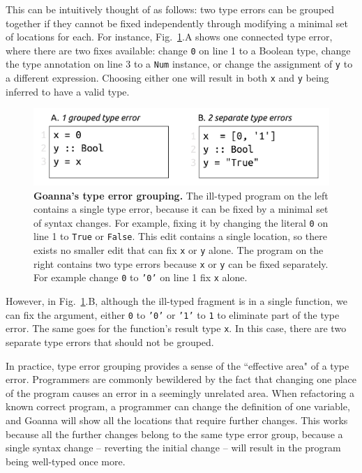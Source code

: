     This can be intuitively thought of as follows: two type errors can be grouped together if they cannot be fixed independently through modifying a minimal set of locations for each. For instance, Fig.~\ref{fig:grouping-example}.A shows one connected type error, where there are two fixes available: change \texttt{0} on line 1 to a Boolean type, change the type annotation on line 3 to a \texttt{Num} instance, or change the assignment of \texttt{y} to a different expression. Choosing either one will result in both \texttt{x} and \texttt{y} being inferred to have a valid type.
    
    

   \begin{figure}[htb!]
        \centering
        \includegraphics[width=0.8\linewidth]{images/Grouping-Example}
        \caption{\textbf{Goanna's type error grouping.} The ill-typed program on the left contains a single type error, because it can be fixed by a minimal set of syntax changes. For example, fixing it by changing the literal \texttt{0} on line 1 to \texttt{True} or \texttt{False}. This edit contains a single location, so there exists no smaller edit that can fix \texttt{x} or \texttt{y} alone. The program on the right contains two type errors because \texttt{x} or \texttt{y} can be fixed separately. For example change \texttt{0} to \texttt{'0'} on line 1 fix \texttt{x} alone. }
        \label{fig:grouping-example}
    \end{figure}



    However, in Fig.~\ref{fig:grouping-example}.B, although the ill-typed fragment is in a single function, we can fix the argument, either \texttt{0} to \texttt{'0'} or \texttt{'1'} to \texttt{1} to eliminate part of the type error. The same goes for the function's result type \texttt{x}. In this case, there are two separate type errors that should not be grouped.

	
	In practice, type error grouping provides a sense of the ``effective area" of a type error. Programmers are commonly bewildered by the fact that changing one place of the program causes an error in a seemingly unrelated area. When refactoring a known correct program, a programmer can change the definition of one variable, and Goanna will show all the locations that require further changes. This works because all the further changes belong to the same type error group, because a single syntax change -- reverting the initial change -- will result in the program being well-typed once more.
	
